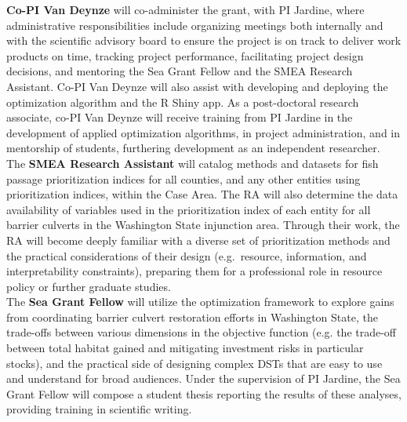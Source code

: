 \documentclass[12pt]{elsarticle}
\begin{document}
\textbf{Co-PI Van Deynze} will co-administer the grant, with PI Jardine, where administrative responsibilities include organizing meetings both internally and with the scientific advisory board to ensure the project is on track to deliver work products on time, tracking project performance, facilitating project design decisions, and mentoring the Sea Grant Fellow and the SMEA Research Assistant. Co-PI Van Deynze will also assist with developing and deploying the optimization algorithm and the R Shiny app. As a post-doctoral research associate, co-PI Van Deynze will receive training from PI Jardine in the development of applied optimization algorithms, in project administration, and in mentorship of students, furthering development as an independent researcher. \\

The \textbf{SMEA Research Assistant} will catalog methods and datasets for fish passage prioritization indices for all counties, and any other entities using prioritization indices, within the Case Area. The RA will also determine the data availability of variables used in the prioritization index of each entity for all barrier culverts in the Washington State injunction area. Through their work, the RA will become deeply familiar with a diverse set of prioritization methods and the practical considerations of their design (e.g.\ resource, information, and interpretability constraints), preparing them for a professional role in resource policy or further graduate studies. \\

The \textbf{Sea Grant Fellow} will utilize the optimization framework to explore gains from coordinating barrier culvert restoration efforts in Washington State, the trade-offs between various dimensions in the objective function (e.g. the trade-off between total habitat gained and mitigating investment risks in particular stocks), and the practical side of designing complex DSTs that are easy to use and understand for broad audiences. Under the supervision of PI Jardine, the Sea Grant Fellow will compose a student thesis reporting the results of these analyses, providing training in scientific writing. \\

\end{document}
